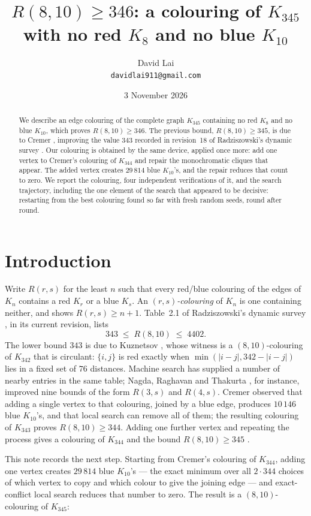 \documentclass[11pt]{article}
\title{$R(8,10)\ge 346$: a colouring of $K_{345}$ with no red $K_8$ and no blue $K_{10}$}
\author{%
  \normalsize David Lai\\
  \normalsize \texttt{davidlai911@gmail.com}
}
\date{3 November 2026}
\newcommand{\R}{R}
\begin{document}
\maketitle

\begin{abstract}
We describe an edge colouring of the complete graph $K_{345}$ containing no red $K_8$ and no blue
$K_{10}$, which proves $\R(8,10)\ge 346$. The previous bound, $\R(8,10)\ge 345$, is due to Cremer
\cite{cremer}, improving the value $343$ recorded in revision~18 of Radziszowski's dynamic survey
\cite{ds1}. Our colouring is obtained by the same device, applied once more: add one vertex to
Cremer's colouring of $K_{344}$ and repair the monochromatic cliques that appear. The added vertex
creates $29\,814$ blue $K_{10}$'s, and the repair reduces that count to zero. We report the colouring,
four independent verifications of it, and the search trajectory, including the one element of the
search that appeared to be decisive: restarting from the best colouring found so far with fresh
random seeds, round after round.
\end{abstract}

\section{Introduction}

Write $\R(r,s)$ for the least $n$ such that every red/blue colouring of the edges of $K_n$ contains a
red $K_r$ or a blue $K_s$. An \emph{$(r,s)$-colouring} of $K_n$ is one containing neither, and shows
$\R(r,s)\ge n+1$. Table~2.1 of Radziszowski's dynamic survey \cite{ds1}, in its current revision,
lists
\[
  343 \;\le\; \R(8,10) \;\le\; 4402 .
\]
The lower bound $343$ is due to Kuznetsov \cite{kuznetsov}, whose witness is a $(8,10)$-colouring of
$K_{342}$ that is circulant: $\{i,j\}$ is red exactly when $\min(|i-j|,342-|i-j|)$ lies in a fixed set
of $76$ distances. Machine search has supplied a number of nearby entries in the same table; Nagda,
Raghavan and Thakurta \cite{nagda}, for instance, improved nine bounds of the form $R(3,s)$ and
$R(4,s)$. Cremer \cite{cremer} observed that adding a single vertex to that colouring, joined
by a blue edge, produces $10\,146$ blue $K_{10}$'s, and that local search can remove all of them; the
resulting colouring of $K_{343}$ proves $\R(8,10)\ge 344$. Adding one further vertex and repeating
the process gives a colouring of $K_{344}$ and the bound $\R(8,10)\ge 345$ \cite{cremer}.

This note records the next step. Starting from Cremer's colouring of $K_{344}$, adding one vertex
creates $29\,814$ blue $K_{10}$'s --- the exact minimum over all $2\cdot 344$ choices of which vertex
to copy and which colour to give the joining edge --- and exact-conflict local search reduces that
number to zero. The result is a $(8,10)$-colouring of $K_{345}$:
\end{document}
